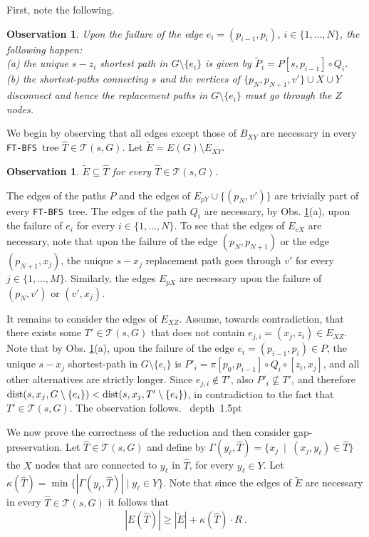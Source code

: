 \documentclass[12pt]{article}
\newtheorem{observation}[theorem]{Observation}
\newcommand{\dist}{\mbox{\rm dist}}
\def\Proof{\par\noindent{\bf Proof:~}}
\def\blackslug{\hbox{\hskip 1pt \vrule width 4pt height 8pt
    depth 1.5pt \hskip 1pt}}
\def\QED{\quad\blackslug\lower 8.5pt\null\par}
\def\FTBFS{\mbox{\tt FT-BFS}}
\begin{document}
First, note the following.
\begin{observation}
\label{obs:reduc_triv_edges}
Upon the failure of the edge $e_i=(p_{i-1}, p_i)$, $i\in \{1, \ldots, N\}$, the following happen:\\
(a) the unique $s-z_{i}$ shortest path in $G \setminus \{e_i\}$ is given
by $\widetilde{P}_i=P[s, p_{i-1}] \circ Q_i$.\\
(b) the shortest-paths connecting $s$ and the vertices of $\{p_N, p_{N+1}, v'\} \cup X \cup Y$ disconnect and hence the replacement paths in $G \setminus \{e_i\}$ must go through the $Z$ nodes.
\end{observation}
\par We begin by observing that all edges except those of $B_{XY}$ are necessary in every \FTBFS\ tree $\widehat{T}\in \mathcal{T}(s,G)$.
Let $\widetilde{E}=E(G) \setminus E_{XY}$.
\begin{observation}
\label{obs:everyftbfs}
$\widetilde{E} \subseteq \widehat{T}$ for every
$\widehat{T} \in \mathcal{T}(s,G)$.
\end{observation}
\Proof
The edges of the paths $P$ and the edges of $E_{pY} \cup \{(p_{N}, v')\}$ are trivially part of every \FTBFS\ tree.
The edges of the path $Q_i$ are necessary, by Obs. \ref{obs:reduc_triv_edges}(a), upon the failure of $e_{i}$ for every $i \in \{1, \ldots, N\}$.
To see that the edges of $E_{vX}$ are necessary, note
that upon the failure of the edge $(p_N, p_{N+1})$ or the
edge $(p_{N+1}, x_j)$, the unique $s-x_j$ replacement path goes through $v'$ for every $j \in \{1, \ldots, M\}$.
Similarly, the edges $E_{pX}$ are necessary
upon the failure of $(p_{N}, v')$ or $(v', x_j)$.
\par It remains to consider the edges of $E_{XZ}$. Assume, towards contradiction, that there exists some $T' \in \mathcal{T}(s,G)$ that does not contain $e_{j,i}=(x_j, z_i) \in E_{XZ}$.
Note that by Obs. \ref{obs:reduc_triv_edges}(a), upon the failure of the edge $e_i=(p_{i-1},p_{i}) \in P$, the unique $s-x_j$ shortest-path in
$G \setminus \{e_i\}$ is $P'_{i}= \pi[p_0,p_{i-1}] \circ Q_{i}\circ [z_{i}, x_j]$, and all other alternatives are strictly longer.
Since $e_{j,i} \notin T'$, also $P'_i \nsubseteq T'$, and therefore
$\dist(s, x_j, G \setminus \{e_i\})< \dist(s, x_j, T' \setminus \{e_i\})$,
in contradiction to the fact that $T' \in \mathcal{T}(s,G)$.
The observation follows.
\QED
We now prove the correctness of the reduction and then consider gap-preservation.
Let $\widehat{T} \in \mathcal{T}(s,G)$ and define by $\Gamma(y_\ell,\widehat{T})=\{x_j ~\mid~ (x_j, y_\ell) \in \widehat{T}\}$
the $X$ nodes that are connected to $y_\ell$ in $\widehat{T}$, for every $y_\ell \in Y$.
Let $\kappa(\widehat{T})=\min\{|\Gamma(y_\ell,\widehat{T})| \mid y_\ell \in Y\}$.
Note that since the edges of $\widetilde{E}$ are necessary in every $\widehat{T} \in \mathcal{T}(s,G)$ it follows that
\begin{equation}
\label{eq:costset}
|E(\widehat{T})|\geq |\widetilde{E}|+\kappa(\widehat{T})\cdot R~.
\end{equation}
\end{document}
